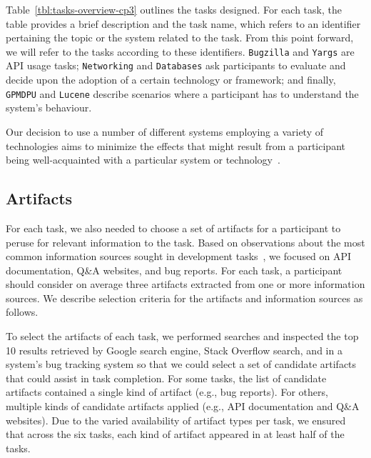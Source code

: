Table~\ref{tbl:tasks-overview-cp3} outlines the tasks designed.
For each task, the table provides a brief description and the task name, which refers to an identifier pertaining the topic or the system related to the task.
From this point forward, we will refer to the tasks according to these identifiers.
\texttt{Bugzilla} and \texttt{Yargs} are API usage tasks; \texttt{Networking} and \texttt{Databases} ask participants to evaluate and decide upon the adoption of a certain technology or framework; and finally, \texttt{GPMDPU} and \texttt{Lucene} describe scenarios where a participant 
has to understand the system's behaviour. 


Our decision to use a number of different systems employing
a variety of technologies aims to minimize the effects that might result from a participant being
well-acquainted with a particular system or technology~\cite{Wildemuth2012, DeGraaf2014}. 







\subsection{Artifacts}
\label{cp3:method-artifacts}



For each task, we also needed to choose a set of artifacts for a
participant to peruse for relevant information to the task.  Based on
observations about the most common information sources sought in
development tasks~\cite{Li2013, Ponzanelli2017},
we focused on API documentation, Q\&A websites, and
bug reports.
For each task, a participant should consider on average three artifacts extracted
from one or more information sources.
We describe selection criteria for the artifacts and information sources as follows.



To select the artifacts of each task, we performed
searches and inspected the top 10 results retrieved by Google search engine, Stack Overflow search, and in a
system's bug tracking system so that we could select a set of candidate artifacts that could
assist in task completion.
For some tasks, the list of candidate
artifacts contained a single kind of artifact (e.g., bug
reports). For others, multiple kinds of candidate artifacts applied
(e.g., API documentation and Q\&A websites). 
Due to the varied availability of artifact types per task, 
we ensured that across
the six tasks, each kind of artifact appeared in at least half of the
tasks.



